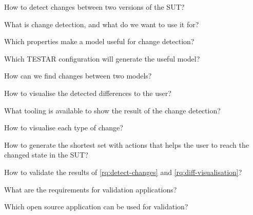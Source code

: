 \begin{questions}
    \item How to detect changes between two versions of the SUT? \label{rq:detect-changes}
    \begin{questions}
        
        \item What is change detection, and what do we want to use it for?
        \item Which properties make a model useful for change detection?
        \item Which TESTAR configuration will generate the useful model?
        \item How can we find changes between two models?
    \end{questions}

    \item How to visualise the detected differences to the user? \label{rq:diff-visualisation}
    \begin{questions}
        \item What tooling is available to show the result of the change detection? \label{rq:tooling}
        \item How to visualise each type of change? \label{rq:type-visualisation}
        \item How to generate the shortest set with actions that helps the user to reach the changed state in the SUT? \label{rq:shortest-set}    
    \end{questions}
    
    \item How to validate the results of \ref{rq:detect-changes} and \ref{rq:diff-visualisation}? \label{rq:validation}
    \begin{questions}
        \item What are the requirements for validation applications? \label{rq:req-apps}
        \item Which open source application can be used for validation? \label{rq:validation-apps}
        \item 
    \end{questions}

\end{questions}

